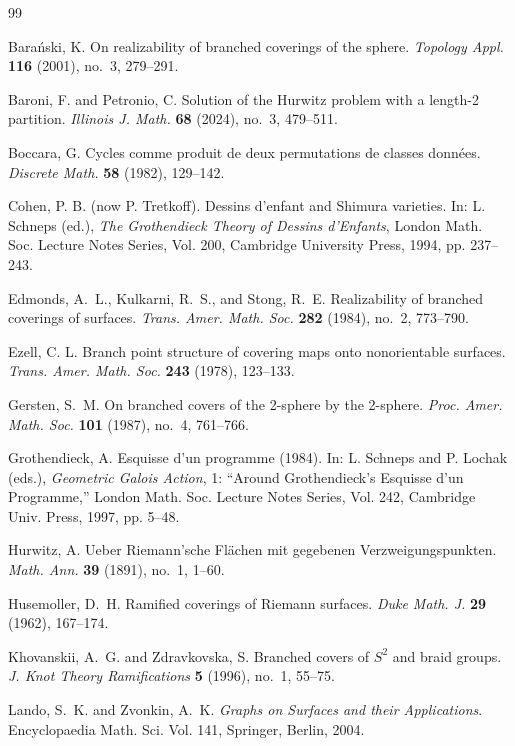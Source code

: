 \documentclass[microtype]{gtpart}     %
\theoremstyle{definition}
\begin{document}
\begin{thebibliography}{99}


Bara\'{n}ski, K.
On realizability of branched coverings of the sphere.
\textit{Topology Appl.} \textbf{116} (2001), no.~3, 279--291.

Baroni, F. and Petronio, C.
Solution of the Hurwitz problem with a length-2 partition.
\textit{Illinois J. Math.} \textbf{68} (2024), no.~3, 479--511.

Boccara, G.
Cycles comme produit de deux permutations de classes donn\'{e}es.
\textit{Discrete Math.} \textbf{58} (1982), 129--142.


Cohen, P. B. (now P. Tretkoff).
Dessins d'enfant and Shimura varieties.
In: L. Schneps (ed.), \textit{The Grothendieck Theory of Dessins d'Enfants},
London Math. Soc. Lecture Notes Series, Vol. 200, Cambridge University Press, 1994, pp. 237--243.

Edmonds, A.~L., Kulkarni, R.~S., and Stong, R.~E.
Realizability of branched coverings of surfaces.
\textit{Trans. Amer. Math. Soc.} \textbf{282} (1984), no.~2, 773--790.

Ezell, C. L.
Branch point structure of covering maps onto nonorientable surfaces.
\textit{Trans. Amer. Math. Soc.} \textbf{243} (1978), 123--133.

Gersten, S.~M.
On branched covers of the 2-sphere by the 2-sphere.
\textit{Proc. Amer. Math. Soc.} \textbf{101} (1987), no.~4, 761--766.

Grothendieck, A.
Esquisse d'un programme (1984).
In: L. Schneps and P. Lochak (eds.), \textit{Geometric Galois Action},
1: ``Around Grothendieck's Esquisse d'un Programme,''
London Math. Soc. Lecture Notes Series, Vol. 242, Cambridge Univ. Press, 1997, pp. 5--48.

Hurwitz, A.
Ueber Riemann'sche Fl\"{a}chen mit gegebenen Verzweigungspunkten.
\textit{Math. Ann.} \textbf{39} (1891), no.~1, 1--60.

Husemoller, D.~H.
Ramified coverings of Riemann surfaces.
\textit{Duke Math. J.} \textbf{29} (1962), 167--174.

Khovanskii, A.~G. and Zdravkovska, S.
Branched covers of $S^{2}$ and braid groups.
\textit{J. Knot Theory Ramifications} \textbf{5} (1996), no.~1, 55--75.

Lando, S.~K. and Zvonkin, A.~K.
\textit{Graphs on Surfaces and their Applications}.
Encyclopaedia Math. Sci. Vol. 141, Springer, Berlin, 2004.


\end{thebibliography}
\end{document}
